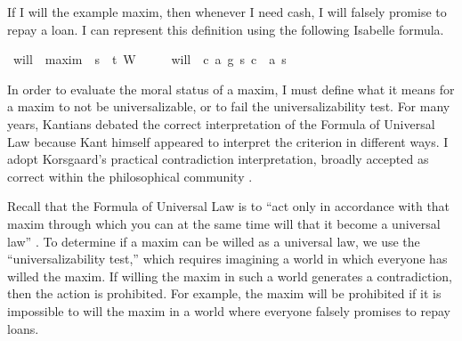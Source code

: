 \begin{isabellebody}
\begin{isamarkuptext}
If I will the example  maxim, then whenever I need cash, 
I will falsely promise to repay a loan. I can represent this definition using the following Isabelle
formula.%
\end{isamarkuptext}\isamarkuptrue%
\isamarkupfalse%
\ will\ {\isacharcolon}{\isacharcolon}\ {\isachardoublequoteopen}maxim\ {\isasymRightarrow}\ s{\isasymRightarrow}\ \ t{\isachardoublequoteclose}\ {\isacharparenleft}{\isachardoublequoteopen}W\ {\isacharunderscore}\ {\isacharunderscore}{\isachardoublequoteclose}{\isacharparenright}\isanewline
\ \ \ {\isachardoublequoteopen}will\ {\isasymequiv}\ {\isasymlambda}{\isacharparenleft}c{\isacharcomma}\ a{\isacharcomma}\ g{\isacharparenright}\ s{\isachardot}\ {\isacharparenleft}c\ \isactrlbold {\isasymrightarrow}\ {\isacharparenleft}a\ s{\isacharparenright}{\isacharparenright}{\isachardoublequoteclose}\isanewline
%
%
\isadelimdocument
%
\endisadelimdocument
%
\isatagdocument
%
\isamarkuptrue%
%
\endisatagdocument
{\isafolddocument}%
%
\isadelimdocument
%
\endisadelimdocument
%
\begin{isamarkuptext}%
In order to evaluate the moral status of a maxim, I must define what it means for a maxim to not be
universalizable, or to fail the universalizability test. For many years, Kantians debated the correct interpretation of 
the Formula of Universal Law because Kant himself appeared to interpret the criterion in different ways. 
I adopt Korsgaard's practical contradiction interpretation, broadly accepted as correct within 
the philosophical community \citep{ebelsduggan}.
 
Recall that the Formula of Universal Law is to “act only in accordance with that maxim through which 
you can at the same time will that it become a universal law” \citep[34]{groundwork}. To determine if a 
maxim can be willed as a universal law, we use the “universalizability test,” which requires 
imagining a world in which everyone has willed the maxim. If willing the maxim in such a world 
generates a contradiction, then the action is prohibited. For example, the 
maxim will be prohibited if it is impossible to will the maxim in a world where everyone falsely promises
to repay loans.


\end{isamarkuptext}
\end{isabellebody}
